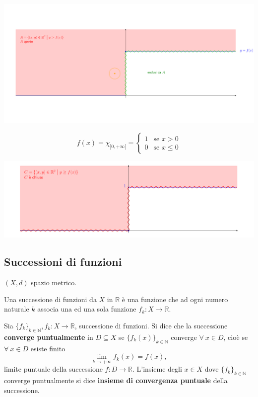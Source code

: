 \begin{exbar}
\begin{example}
\begin{enumerate}
		\begin{center}
			\includegraphics[width=0.7\linewidth]{spazi_metrici_e_normati/pag181_1}
			\label{fig:pag1811}
		\end{center}
		
		\begin{equation*}
			f(x) = 		\chi_{]0,+\infty[} = 
			\begin{cases}
				1 & \text{se } x > 0
				\\
				0 &  \text{se } x \leq 0
			\end{cases}
		\end{equation*}
		
		\begin{center}
			\includegraphics[width=0.7\linewidth]{spazi_metrici_e_normati/pag181_2}
			\label{fig:pag1812}
		\end{center}
	\end{enumerate}
\end{example}
\end{exbar}


\subsection{Successioni di funzioni}

\begin{definition}
	$(X,d)$ spazio metrico.
	
	Una successione di funzioni da $X$ in $\mathbb{R}$ è una funzione che ad ogni numero naturale $k$ associa una ed una sola funzione $f_k : X \rightarrow \mathbb{R}$. 
\end{definition}


\begin{definition}
	Sia $\{ f_k \}_{k \in \mathbb{N}}, f_k : X \rightarrow \mathbb{R}$, successione di funzioni. Si dice che la successione \textbf{converge puntualmente} in $D \subseteq X$ se $\{ f_k(x) \}_{k \in \mathbb{N}}$ converge $\forall \ x \in D$, cioè se $\forall \ x \in D$ esiste finito
	\begin{equation*}
		\lim_{k \rightarrow + \infty} f_k(x) = f(x),
	\end{equation*}
	limite puntuale della successione $f : D \rightarrow \mathbb{R}$. L'insieme degli $x \in X$ dove $\{f_k \}_{k \in \mathbb{N}}$ converge puntualmente si dice \textbf{insieme di convergenza puntuale} della successione.
\end{definition}



